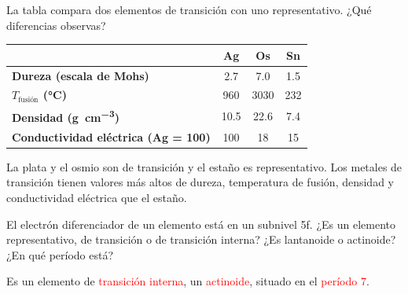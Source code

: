 \begin{exercise}
    La tabla compara dos elementos de transición con uno representativo. ¿Qué diferencias observas?
    \begin{center}
        \begin{tabular}{@{}lccc@{}}
            \toprule
             & \textbf{Ag} & \textbf{Os} & \textbf{Sn} \\
            \midrule
            \textbf{Dureza (escala de Mohs)} & \num{2.7} & \num{7.0} & \num{1.5} \\[3pt]
            \textbf{\(T_\text{fusión}\) (\unit{\celsius})} & 960 & \num{3030} & 232 \\[3pt]
            \textbf{Densidad (\unit{\gram\per\cubic\centi\metre})} & \num{10.5} & \num{22.6} & \num{7.4} \\[3pt]
            \textbf{Conductividad eléctrica (Ag = 100)} & 100 & 18 & 15 \\
            \bottomrule
        \end{tabular}
    \end{center}
    \begin{solu}
        La plata y el osmio son de transición y el estaño es representativo. Los metales de transición tienen valores más altos de dureza, temperatura de fusión, densidad y conductividad eléctrica que el estaño.
    \end{solu}
\end{exercise}

\begin{exercise}
    El electrón diferenciador de un elemento está en un subnivel 5f. ¿Es un elemento representativo, de transición o de transición interna? ¿Es lantanoide o actinoide? ¿En qué período está?
    \begin{solu}
        Es un elemento de \textcolor{red}{transición interna}, un \textcolor{red}{actinoide}, situado en el \textcolor{red}{período 7}.
    \end{solu}
\end{exercise}

